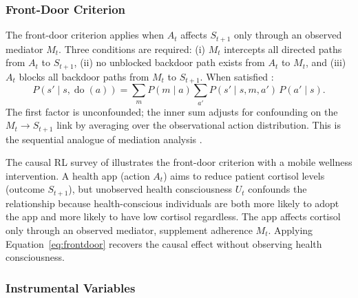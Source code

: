 \subsubsection{Front-Door Criterion}
\label{subsubsec:frontdoor}

The front-door criterion applies when $A_t$ affects $S_{t+1}$ only through an observed mediator $M_t$. Three conditions are required: (i) $M_t$ intercepts all directed paths from $A_t$ to $S_{t+1}$, (ii) no unblocked backdoor path exists from $A_t$ to $M_t$, and (iii) $A_t$ blocks all backdoor paths from $M_t$ to $S_{t+1}$. When satisfied \citep{pearl2009causality}:
\begin{equation}
P(s' \mid s, \operatorname{do}(a)) = \sum_{m} P(m \mid a) \sum_{a'} P(s' \mid s, m, a') \, P(a' \mid s).
\label{eq:frontdoor}
\end{equation}
The first factor is unconfounded; the inner sum adjusts for confounding on the $M_t \to S_{t+1}$ link by averaging over the observational action distribution. This is the sequential analogue of mediation analysis \citep{dacostacunha2025unifying}.

The causal RL survey of \citet{dacostacunha2025unifying} illustrates the front-door criterion with a mobile wellness intervention. A health app (action $A_t$) aims to reduce patient cortisol levels (outcome $S_{t+1}$), but unobserved health consciousness $U_t$ confounds the relationship because health-conscious individuals are both more likely to adopt the app and more likely to have low cortisol regardless. The app affects cortisol only through an observed mediator, supplement adherence $M_t$. Applying Equation~\eqref{eq:frontdoor} recovers the causal effect without observing health consciousness.

\subsubsection{Instrumental Variables}
\label{subsubsec:iv}

